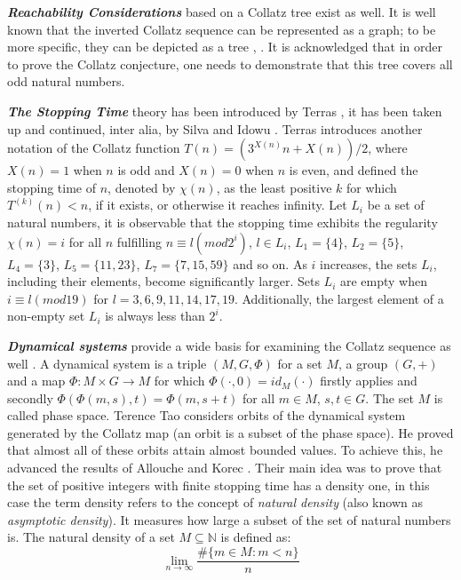 \par\medskip
\textit{\textbf{Reachability Considerations}} based on a Collatz tree exist as well. It is well known that the inverted Collatz sequence can be represented as a graph; to be more specific, they can be depicted as a tree \cite{Ref_Andrei_Masalagiu}, \cite{Ref_Kak_2014}. It is acknowledged that in order to prove the Collatz conjecture, one needs to demonstrate that this tree covers all odd natural numbers.

\par\medskip
\textit{\textbf{The Stopping Time}} theory has been introduced by Terras \cite{Ref_Terras_1976}, it has been taken up and continued, inter alia, by Silva \cite{Ref_Silva_1999} and Idowu \cite{Ref_Idowu_2015}. Terras introduces another notation of the Collatz function $T(n)=(3^{X(n)}n+X(n))/2$, where $X(n)=1$ when $n$ is odd and $X(n)=0$ when $n$ is even, and defined the stopping time of $n$, denoted by $\chi(n)$, as the least positive $k$ for which $T^{(k)}(n)<n$, if it exists, or otherwise it reaches infinity. Let $L_i$ be a set of natural numbers, it is observable that the stopping time exhibits the regularity $\chi(n)=i$ for all $n$ fulfilling $n\equiv l(mod 2^i)$, $l\in L_i$, $L_1=\{4\}$, $L_2=\{5\}$, $L_4=\{3\}$, $L_5=\{11,23\}$, $L_7=\{7,15,59\}$ and so on. As $i$ increases, the sets $L_i$, including their elements, become significantly larger. Sets $L_i$ are empty when $i\equiv l(mod 19)$ for $l=3,6,9,11,14,17,19$. Additionally, the largest element of a non-empty set $L_i$ is always less than $2^i$.

\par\medskip
\textit{\textbf{Dynamical systems}} provide a wide basis for examining the Collatz sequence as well \cite{Ref_Wirsching_1998}. A dynamical system \cite[p.~464]{Ref_Walz_2017} is a triple $(M,G,\Phi)$ for a set $M$, a group $(G,+)$ and a map $\Phi:M\times G\to M$ for which $\Phi(\cdot,0)=id_M(\cdot)$ firstly applies and secondly $\Phi\left(\Phi(m,s),t\right)=\Phi(m,s+t)$ for all $m\in M$, $s,t\in G$. The set $M$ is called phase space. Terence Tao \cite{Ref_Tao_2019} considers orbits of the dynamical system generated by the Collatz map (an orbit is a subset of the phase space). He proved that almost all of these orbits attain almost bounded values. To achieve this, he advanced the results of Allouche \cite{Ref_Allouche_1978} and Korec \cite{Ref_Korec_1994}. Their main idea was to prove that the set of positive integers with finite stopping time has a density one, in this case the term density refers to the concept of \textit{natural density} (also known as \textit{asymptotic density}). It measures how large a subset of the set of natural numbers is. The natural density of a set $M\subseteq\mathbb{N}$ is defined as:
\[
\lim_{n\to\infty}\frac{\#\{m\in M:m<n\}}{n}
\]

